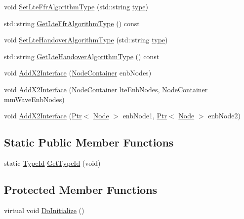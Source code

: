 \begin{DoxyCompactItemize}
void \hyperlink{classns3_1_1MmWaveHelper_a9c650eccf2725463af5bbf755a62bf8c}{Set\+Lte\+Ffr\+Algorithm\+Type} (std\+::string \hyperlink{visualizer-ideas_8txt_add98db9e15e2a58cf2b57623e7aa893a}{type})
\item 
std\+::string \hyperlink{classns3_1_1MmWaveHelper_a9b6d9d9ea24485c6ad27a42bfc0ffa18}{Get\+Lte\+Ffr\+Algorithm\+Type} () const 
\item 
void \hyperlink{classns3_1_1MmWaveHelper_a4525907da523b03310aafe6c57d63d25}{Set\+Lte\+Handover\+Algorithm\+Type} (std\+::string \hyperlink{visualizer-ideas_8txt_add98db9e15e2a58cf2b57623e7aa893a}{type})
\item 
std\+::string \hyperlink{classns3_1_1MmWaveHelper_a12eee130a565fd3a9b3752ea1772974d}{Get\+Lte\+Handover\+Algorithm\+Type} () const 
\item 
void \hyperlink{classns3_1_1MmWaveHelper_a879c5e60c46b04b9decd31624b91cc70}{Add\+X2\+Interface} (\hyperlink{classns3_1_1NodeContainer}{Node\+Container} enb\+Nodes)
\item 
void \hyperlink{classns3_1_1MmWaveHelper_af66ea0f5bae007a1a47e18a1542a9c9c}{Add\+X2\+Interface} (\hyperlink{classns3_1_1NodeContainer}{Node\+Container} lte\+Enb\+Nodes, \hyperlink{classns3_1_1NodeContainer}{Node\+Container} mm\+Wave\+Enb\+Nodes)
\item 
void \hyperlink{classns3_1_1MmWaveHelper_a16ac9ec60dcdb1339b8067ec49e2be5b}{Add\+X2\+Interface} (\hyperlink{classns3_1_1Ptr}{Ptr}$<$ \hyperlink{classns3_1_1Node}{Node} $>$ enb\+Node1, \hyperlink{classns3_1_1Ptr}{Ptr}$<$ \hyperlink{classns3_1_1Node}{Node} $>$ enb\+Node2)
\end{DoxyCompactItemize}
\subsection*{Static Public Member Functions}
\begin{DoxyCompactItemize}
\item 
static \hyperlink{classns3_1_1TypeId}{Type\+Id} \hyperlink{classns3_1_1MmWaveHelper_adbd6ce465a189842ec23773eed1a1d18}{Get\+Type\+Id} (void)
\end{DoxyCompactItemize}
\subsection*{Protected Member Functions}
\begin{DoxyCompactItemize}
\item 
virtual void \hyperlink{classns3_1_1MmWaveHelper_adfc73e7ce8c8bf424516670fd3c19592}{Do\+Initialize} ()
\end{DoxyCompactItemize}
